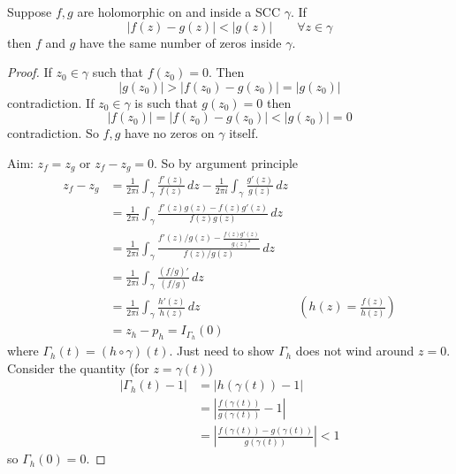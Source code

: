 \documentclass[10pt, a4paper]{article}
\begin{document}
\begin{theorem}
    Suppose $f, g$ are holomorphic on and inside a SCC $\gamma$.
    If
    \[
    |f(z) - g(z)| < |g(z)|\qquad\forall z \in \gamma
    \]
    then $f$ and $g$ have the same number of zeros inside $\gamma$.

    \begin{proof}
        If $z_0 \in \gamma$ such that $f(z_0) = 0$.
        Then
        \[
        |g(z_0)| > |f(z_0) - g(z_0)| = |g(z_0)|
        \]
        contradiction.
        If $z_0 \in \gamma$ is such that $g(z_0) = 0$ then
        \[
        |f(z_0)| = |f(z_0) - g(z_0)| < |g(z_0)| = 0
        \]
        contradiction.
        So $f, g$ have no zeros on $\gamma$ itself.

        Aim:
        $z_f = z_g$ or $z_f - z_g = 0$.
        So by argument principle
        \begin{align*}
            z_f - z_g &= \frac{1}{2\pi i}\int_{\gamma}\frac{f'(z)}{f(z)}\,dz - \frac{1}{2\pi i}\int_{\gamma}\frac{g'(z)}{g(z)}\,dz \\
            &= \frac{1}{2\pi i}\int_{\gamma}\frac{f'(z)g(z) - f(z)g'(z)}{f(z)g(z)}\,dz \\
            &= \frac{1}{2\pi i}\int_{\gamma}\frac{f'(z) / g(z) - \frac{f(z)g'(z)}{g(z) ^ 2}}{f(z) / g(z)}\,dz \\
            &= \frac{1}{2\pi i}\int_{\gamma}\frac{\left(f / g\right)'}{\left(f / g\right)}\,dz \\
            &= \frac{1}{2\pi i}\int_{\gamma}\frac{h'(z)}{h(z)}\,dz &\left(h(z) = \frac{f(z)}{h(z)}\right) \\
            &= z_h - p_h = I_{\Gamma_h}(0)
        \end{align*}
        where $\Gamma_h(t) = (h \circ \gamma)(t)$.
        Just need to show $\Gamma_h$ does not wind around $z = 0$.
        Consider the quantity
        (for $z = \gamma(t)$)
        \begin{align*}
            |\Gamma_h(t) - 1| &= |h(\gamma(t)) - 1| \\
            &= \left|\frac{f(\gamma(t))}{g(\gamma(t))} - 1\right| \\
            &= \left|\frac{f(\gamma(t)) - g(\gamma(t))}{g(\gamma(t))}\right| < 1
        \end{align*}
        so $\Gamma_h(0) = 0$.
    \end{proof}
\end{theorem}
\end{document}
